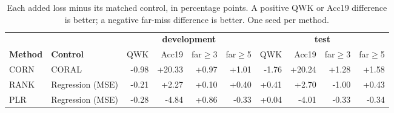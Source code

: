 \begin{table}[H]
\centering
\footnotesize
\caption{Each added loss minus its matched control, in percentage points. A positive QWK or Acc19 difference is better; a negative far-miss difference is better. One seed per method.}
\label{tab:res-newloss-delta}
\begin{adjustbox}{max width=\textwidth}
\begin{tabular}{llrrrrrrrr}
\toprule
& & \multicolumn{4}{c}{\textbf{development}} & \multicolumn{4}{c}{\textbf{test}} \\
\cmidrule(lr){3-6}\cmidrule(lr){7-10}
\textbf{Method} & \textbf{Control} & QWK & Acc19 & far$\geq$3 & far$\geq$5 & QWK & Acc19 & far$\geq$3 & far$\geq$5 \\
\midrule
CORN & CORAL & -0.98 & +20.33 & +0.97 & +1.01 & -1.76 & +20.24 & +1.28 & +1.58 \\
RANK & Regression (MSE) & -0.21 & +2.27 & +0.10 & +0.40 & +0.41 & +2.70 & -1.00 & +0.43 \\
PLR & Regression (MSE) & -0.28 & -4.84 & +0.86 & -0.33 & +0.04 & -4.01 & -0.33 & -0.34 \\
\bottomrule
\end{tabular}
\end{adjustbox}
\end{table}
